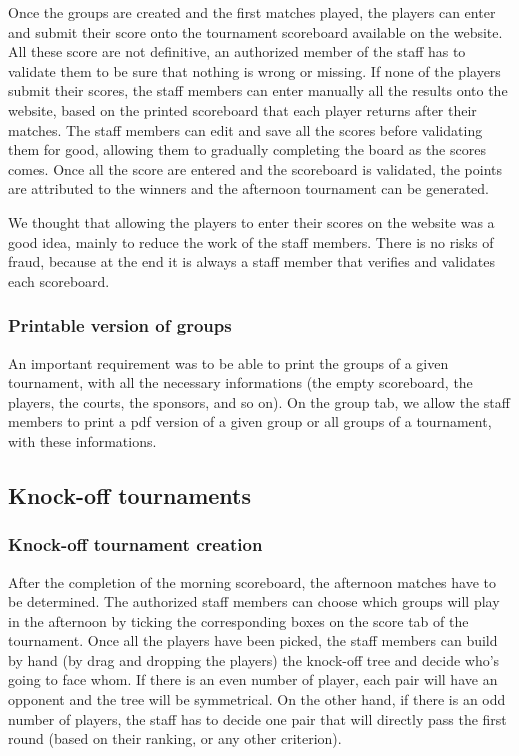 Once the groups are created and the first matches played, the players can enter and submit their score onto the tournament scoreboard available on the website. All these score are not definitive, an authorized member of the staff has to validate them to be sure that nothing is  wrong or missing. If none of the players submit their scores, the staff members can enter manually all the results onto the website, based on the printed scoreboard that each player returns after their matches. The staff members can edit and save all the scores before validating them for good, allowing them to gradually completing the board as the scores comes. Once all the score are entered and the scoreboard is validated, the points are attributed to the winners and the afternoon tournament can be generated. \newline

We thought that allowing the players to enter their scores on the website was a good idea, mainly to reduce the work of the staff members. There is no risks of fraud, because at the end it is always a staff member that verifies and validates each scoreboard.

\subsubsection{Printable version of groups}
\label{subs:Printable version of groups}


An important requirement was to be able to print the groups of a given tournament, with all the necessary informations (the empty scoreboard, the players, the courts, the sponsors, and so on). On the group tab, we allow the staff members to print a pdf version of a given group or all groups of a tournament, with these informations. 

\subsection{Knock-off tournaments}
\label{sub:Knock-off tournaments}

\subsubsection{Knock-off tournament creation}
\label{subs:Knock-off tournament creation}


After the completion of the morning scoreboard, the afternoon matches have to be determined. The authorized staff members can choose which groups will play in the afternoon by ticking the corresponding boxes on the score tab of the tournament. Once all the players have been picked, the staff members can build by hand (by drag and dropping the players) the knock-off tree and decide who's going to face whom. If there is an even number of player, each pair will have an opponent and the tree will be symmetrical. On the other hand, if there is an odd number of players, the staff has to decide one pair that will directly pass the first round (based on their ranking, or any other criterion).\newline

